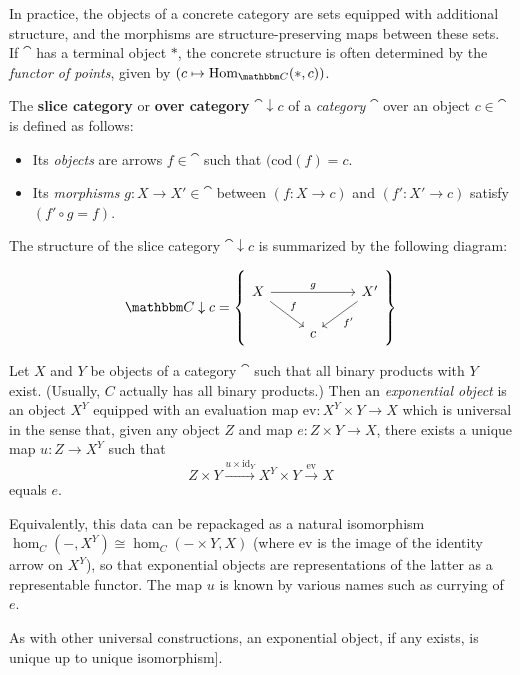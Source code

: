\documentclass[a4paper,11pt]{article}  %
\begin{document}
\begin{remark}\label{rem:concrete_terminal}
	In practice, the objects of a concrete category are sets equipped with additional structure, and the morphisms are structure-preserving maps between these sets.\\
	If $\cat$  has a terminal object $*$, the concrete structure is often determined by the \emph{functor of points}, given by $(c \mapsto \Hom_{\cat} (*, c))$.
\end{remark}

\begin{definition}\label{def:overcat}
The \textbf{slice category} or \textbf{over category} $\cat \downarrow c$  of a \emph{category} $\cat$ over an object $c\in\cat$  is defined as follows:

\begin{itemize}
    \item Its \emph{objects} are arrows $f\in\cat$  such that $(\mathrm{cod}(f) = c$.
    \item Its \emph{morphisms} $g: X \to X' \in \cat $ between $(f: X \to c)$ and $(f': X' \to c)$ satisfy $(f' \circ g = f)$.
\end{itemize}

The structure of the slice category $\cat \downarrow c$ is summarized by the following diagram:

\begin{displaymath}
	\cat \downarrow c =
	\left\lbrace
		\begin{tikzcd}
			X \ar[rr,"g"] \ar[dr,"f"] && X' \ar[dl,"f'"] \\
			&c&
		\end{tikzcd}
	\right\rbrace
\end{displaymath}
\end{definition}

\begin{definition}
Let $X$ and $Y$ be objects of a category $\cat$ such that all binary products with $Y$ exist.  
(Usually, $C$ actually has all binary products.)  
Then an \emph{exponential object} is an object $X^Y$ equipped with an evaluation map $\mathrm{ev}\colon X^Y \times Y \to X$ which is universal in the sense that, given any object $Z$ and map $e\colon Z \times Y \to X$, there exists a unique map $u\colon Z \to X^Y$ such that
$$ Z \times Y \stackrel{u \times \mathrm{id}_Y}\to X^Y \times Y \stackrel{\mathrm{ev}}\to X $$
equals $e$.

Equivalently, this data can be repackaged as a natural isomorphism $\hom_C(-, X^Y) \cong \hom_C(- \times Y, X)$ (where $\mathrm{ev}$ is the image of the identity arrow on $X^Y$), so that exponential objects are representations of the latter as a representable functor.
The map $u$ is known by various names such as  currying  of $e$.  

As with other  universal constructions, an exponential object, if any exists, is  unique up to unique isomorphism].
\end{definition}
\end{document}

